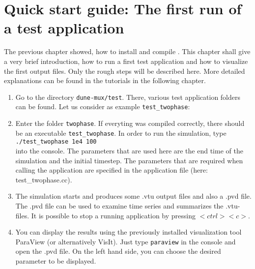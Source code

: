 \section[Quick start guide]{Quick start guide: The first run of a test application}\label{quick-start-guide}

The previous chapter showed, how to install and compile \Dumux. This chapter shall give a very brief introduction, how to run a first test application and how to visualize the first output files. Only the rough steps will be described here. More detailed explanations can be found in the tutorials in the following chapter.

\begin{enumerate}
 \item Go to the directory \texttt{dune-mux/test}. There, various test application folders can be found. Let us consider as example \texttt{test{\_}twophase}:
 \item Enter the folder \texttt{twophase}. If everyting was compiled correctly, there should be an executable \texttt{test{\_}twophase}. In order to run the simulation, type\\ 
\texttt{./test{\_}twophase 1e4 100}\\
into the console. The parameters that are used here are the end time of the simulation and the initial timestep. The parameters that are required when calling the application are specified in the application file (here: test{\_}twophase.cc).
 \item The simulation starts and produces some .vtu output files and also a .pvd file. The .pvd file can be used to examine time series and summarizes the .vtu-files. It is possible to stop a running application by pressing $<ctrl><c>$.
 \item You can display the results using the previously installed visualization tool ParaView (or alternatively VisIt). Just type \texttt{paraview} in the console and open the .pvd file. On the left hand side, you can choose the desired parameter to be displayed.
\end{enumerate}
% 
%
%


